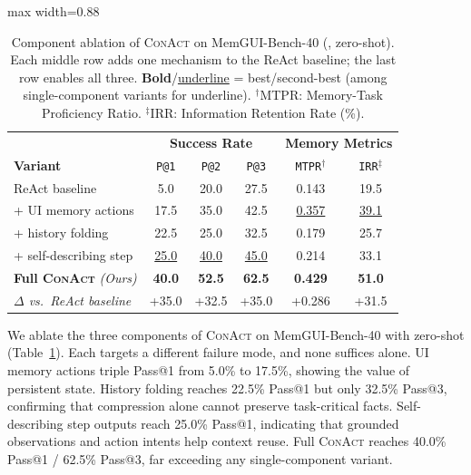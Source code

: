 \documentclass{llmxive}
\providecommand{\llmname}[1]{{\fontfamily{pcr}\selectfont{#1}}}
\providecommand{\conact}{\textsc{ConAct}\xspace}
\providecommand{\rise}[1]{#1}
\providecommand{\arraystretch}{1.06}
\begin{document}
\begin{table}[!htbp]
  \centering
  \footnotesize
  \renewcommand{\arraystretch}{1.06}
  \setlength{\tabcolsep}{4pt}
  \begin{adjustbox}{max width=0.88\linewidth}
  \begin{tabular}{@{}l | ccc | cc@{}}
    \toprule
    & \multicolumn{3}{c|}{\textbf{Success Rate}} & \multicolumn{2}{c}{\textbf{Memory Metrics}} \\
    \textbf{Variant} & \texttt{P@1} & \texttt{P@2} & \texttt{P@3} & \texttt{MTPR}$^\dagger$ & \texttt{IRR}$^\ddagger$ \\
    \midrule
    ReAct baseline
      & 5.0  & 20.0 & 27.5
      & 0.143 & 19.5 \\
    \midrule
    \quad + UI memory actions
      & 17.5 & 35.0 & 42.5
      & \underline{0.357} & \underline{39.1} \\
    \quad + history folding
      & 22.5 & 25.0 & 32.5
      & 0.179 & 25.7 \\
    \quad + self-describing step
      & \underline{25.0} & \underline{40.0} & \underline{45.0}
      & 0.214 & 33.1 \\
    \midrule
    \addlinespace[2pt]
    \rowcolor{oursrowcolor} \textbf{Full \conact} \textit{(Ours)}
      & \textbf{40.0} & \textbf{52.5} & \textbf{62.5}
      & \textbf{0.429} & \textbf{51.0} \\
    \multicolumn{1}{l}{\quad\textit{\footnotesize $\Delta$ vs.\ ReAct baseline}}
      & {\footnotesize\rise{+35.0}} & {\footnotesize\rise{+32.5}} & {\footnotesize\rise{+35.0}}
      & {\footnotesize\rise{+0.286}} & {\footnotesize\rise{+31.5}} \\
    \bottomrule
  \end{tabular}%
  \end{adjustbox}
  \caption{Component ablation of \conact on MemGUI-Bench-40 (\llmname{Qwen3-VL-235B-Thinking}, zero-shot). Each middle row adds one mechanism to the ReAct baseline; the last row enables all three. \textbf{Bold}/\underline{underline} = best/second-best (among single-component variants for underline). $^\dagger$MTPR: Memory-Task Proficiency Ratio. $^\ddagger$IRR: Information Retention Rate (\%).}
  \label{tab:ablation-study}
\end{table}

\vspace{-0.15em}

We ablate the three components of \conact on MemGUI-Bench-40 with zero-shot \llmname{Qwen3-VL-235B-Thinking} (Table~\ref{tab:ablation-study}). Each targets a different failure mode, and none suffices alone. UI memory actions triple Pass@1 from 5.0\% to 17.5\%, showing the value of persistent state. History folding reaches 22.5\% Pass@1 but only 32.5\% Pass@3, confirming that compression alone cannot preserve task-critical facts. Self-describing step outputs reach 25.0\% Pass@1, indicating that grounded observations and action intents help context reuse. Full \conact reaches 40.0\% Pass@1 / 62.5\% Pass@3, far exceeding any single-component variant. 
\end{document}
